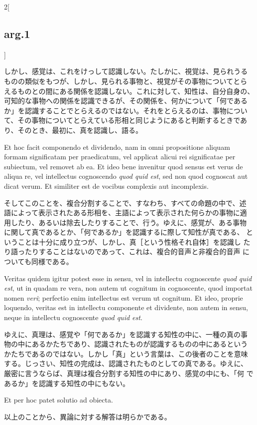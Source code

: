 \documentclass[paper=a4paper,fontsize=10pt,jafontsize=9pt,titlepage]{jlreq}
\begin{document}
\begin{paracol}{2}[\subsection{arg.1}]
\switchcolumn

しかし、感覚は、これをけっして認識しない。たしかに、視覚は、見られうる
ものの類似をもつが、しかし、見られる事物と、視覚がその事物についてとら
えるものとの間にある関係を認識しない。これに対して、知性は、自分自身の、
可知的な事物への関係を認識できるが、その関係を、何かについて「何である
か」を認識することでとらえるのではない。それをとらえるのは、事物につい
て、その事物についてとらえている形相と同じようにあると判断するときであ
り、そのとき、最初に、真を認識し、語る。

\switchcolumn*


Et hoc facit componendo et dividendo, nam in omni propositione aliquam
formam significatam per praedicatum, vel applicat alicui rei
significatae per subiectum, vel removet ab ea. Et ideo bene invenitur
quod sensus est verus de aliqua re, vel intellectus cognoscendo
{\itshape quod quid est}, sed non quod cognoscat aut dicat verum. Et
similiter est de vocibus complexis aut incomplexis.

\switchcolumn

そしてこのことを、複合分割することで、すなわち、すべての命題の中で、述
語によって表示されたある形相を、主語によって表示された何らかの事物に適
用したり、あるいは除去したりすることで、行う。ゆえに、感覚が、ある事物
に関して真であるとか、「何であるか」を認識するに際して知性が真である、
ということは十分に成り立つが、しかし、真［という性格それ自体］を認識し
たり語ったりすることはないのであって、これは、複合的音声と非複合的音声
についても同様である。

\switchcolumn*


Veritas quidem igitur potest esse in sensu, vel in intellectu
cognoscente {\itshape quod quid est}, ut in quadam re vera, non autem
ut cognitum in cognoscente, quod importat nomen {\itshape veri};
perfectio enim intellectus est verum ut cognitum. Et ideo, proprie
loquendo, veritas est in intellectu componente et dividente, non autem
in sensu, neque in intellectu cognoscente {\itshape quod quid est}.

\switchcolumn

ゆえに、真理は、感覚や「何であるか」を認識する知性の中に、一種の真の事
物の中にあるかたちであり、認識されたものが認識するものの中にあるという
かたちであるのではない。しかし「真」という言葉は、この後者のことを意味
する。じっさい、知性の完成は、認識されたものとしての真である。ゆえに、
厳密に言うならば、真理は複合分割する知性の中にあり、感覚の中にも、「何
であるか」を認識する知性の中にもない。

\switchcolumn*


Et per hoc patet solutio ad obiecta.

\switchcolumn

以上のことから、異論に対する解答は明らかである。

\end{paracol}
\newpage
\end{document}
